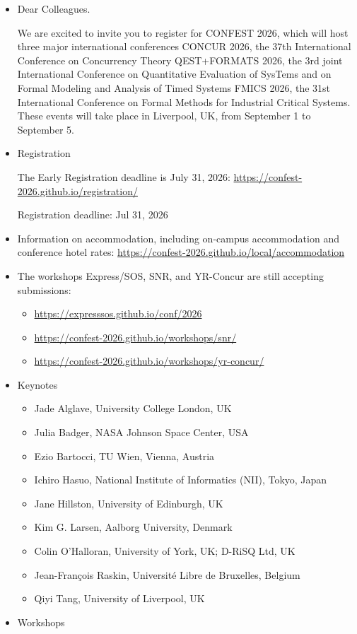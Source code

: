 \documentclass[prodmode,acmtecs]{acmsmall} %
\begin{document}
\begin{itemize}\item  Dear Colleagues.  
 
  We are excited to invite you to register for CONFEST 2026, which will host three major international conferences CONCUR 2026, the 37th International Conference on Concurrency Theory QEST+FORMATS 2026, the 3rd joint International Conference on Quantitative Evaluation of SysTems and on Formal Modeling and Analysis of Timed Systems FMICS 2026, the 31st International Conference on Formal Methods for Industrial Critical Systems. These events will take place in Liverpool, UK, from September 1 to September 5. 
 
\item  Registration 
 
  The Early Registration deadline is July 31, 2026: \href{https://confest-2026.github.io/registration/}{https://confest-2026.github.io/registration/} 
 
Registration deadline: Jul 31, 2026 
 
\item  Information on accommodation, including on-campus accommodation and conference hotel rates: \href{https://confest-2026.github.io/local/accommodation}{https://confest-2026.github.io/local/accommodation} 
 
\item  The workshops Express/SOS, SNR, and YR-Concur are still accepting submissions:  
 
\begin{itemize}\item  \href{https://expresssos.github.io/conf/2026}{https://expresssos.github.io/conf/2026}
\item  \href{https://confest-2026.github.io/workshops/snr/}{https://confest-2026.github.io/workshops/snr/}
\item  \href{https://confest-2026.github.io/workshops/yr-concur/}{https://confest-2026.github.io/workshops/yr-concur/}
\end{itemize} 
\item  Keynotes 
 
\begin{itemize}\item  Jade Alglave, University College London, UK
\item  Julia Badger, NASA Johnson Space Center, USA
\item  Ezio Bartocci, TU Wien, Vienna, Austria
\item  Ichiro Hasuo, National Institute of Informatics (NII), Tokyo, Japan
\item  Jane Hillston, University of Edinburgh, UK
\item  Kim G. Larsen, Aalborg University, Denmark
\item  Colin O'Halloran, University of York, UK; D-RiSQ Ltd, UK
\item  Jean-François Raskin, Université Libre de Bruxelles, Belgium
\item  Qiyi Tang, University of Liverpool, UK
\end{itemize} 
\item  Workshops 
 

\end{itemize}
\end{document}
